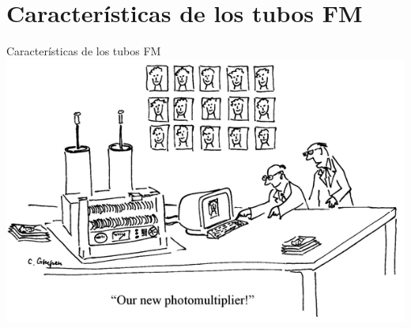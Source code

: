 \documentclass[a4paper,10pt]{beamer}
\begin{document}
\section{Características de los tubos FM}

\begin{frame}
\begin{center}
 \Huge{\color{blue}Características de los tubos FM} \\
 \vspace{0.5cm}
 \includegraphics[scale=1]{fig14}
\end{center}
\end{frame}
\end{document}

